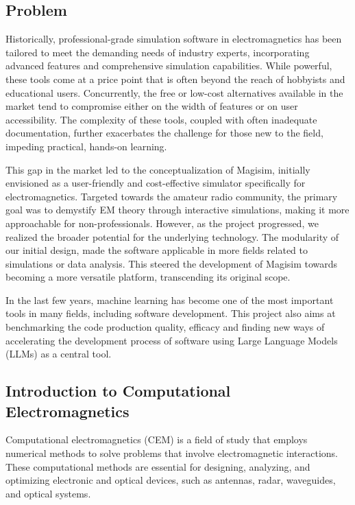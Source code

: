 \documentclass[11pt, a4paper, titlepage]{article}
\begin{document}
\subsection{Problem}
Historically, professional-grade simulation software in electromagnetics has been tailored to meet the demanding needs of industry experts, incorporating advanced features and comprehensive simulation capabilities. While powerful, these tools come at a price point that is often beyond the reach of hobbyists and educational users. Concurrently, the free or low-cost alternatives available in the market tend to compromise either on the width of features or on user accessibility. The complexity of these tools, coupled with often inadequate documentation, further exacerbates the challenge for those new to the field, impeding practical, hands-on learning.

This gap in the market led to the conceptualization of Magisim, initially envisioned as a user-friendly and cost-effective simulator specifically for electromagnetics. Targeted towards the amateur radio community, the primary goal was to demystify EM theory through interactive simulations, making it more approachable for non-professionals. However, as the project progressed, we realized the broader potential for the underlying technology. The modularity of our initial design, made the software applicable in more fields related to simulations or data analysis. This steered the development of Magisim towards becoming a more versatile platform, transcending its original scope.

In the last few years, machine learning has become one of the most important tools in many fields, including software development. This project also aims at benchmarking the code production quality, efficacy and finding new ways of accelerating the development process of software using Large Language Models (LLMs) as a central tool.

\newpage

\subsection{Introduction to Computational Electromagnetics}
Computational electromagnetics (CEM) is a field of study that employs numerical methods to solve problems that involve electromagnetic interactions. These computational methods are essential for designing, analyzing, and optimizing electronic and optical devices, such as antennas, radar, waveguides, and optical systems.
\end{document}
